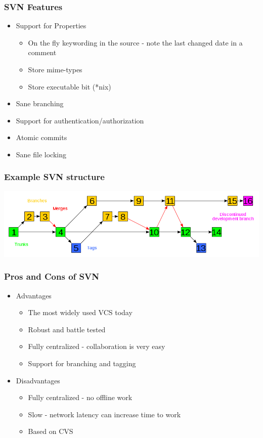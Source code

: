 \documentclass{beamer}
\begin{document}
\begin{frame}
    \frametitle{SVN Features}
    \begin{itemize}
	\item Support for Properties
	\begin{itemize}
	    \item On the fly keywording in the source - note the last changed date in a comment
	    \item Store mime-types
	    \item Store executable bit (*nix)
	\end{itemize}
    \item Sane branching
    \item Support for authentication/authorization
    \item Atomic commits
    \item Sane file locking
    \end{itemize}
\end{frame}

\begin{frame}
    \frametitle{Example SVN structure}
    \includegraphics[scale = 0.30]{Subversion_project_visualization.png}
\end{frame}

\begin{frame}
    \frametitle{Pros and Cons of SVN}
    \begin{itemize}
	\item Advantages
	\begin{itemize}
	    \item The most widely used VCS today
	    \item Robust and battle tested
	    \item Fully centralized - collaboration is very easy
	    \item Support for branching and tagging
	\end{itemize}
	\item Disadvantages
	\begin{itemize}
	    \item Fully centralized - no offline work
	    \item Slow - network latency can increase time to work
	    \item Based on CVS
	\end{itemize}
    \end{itemize}
\end{frame}
\end{document}
